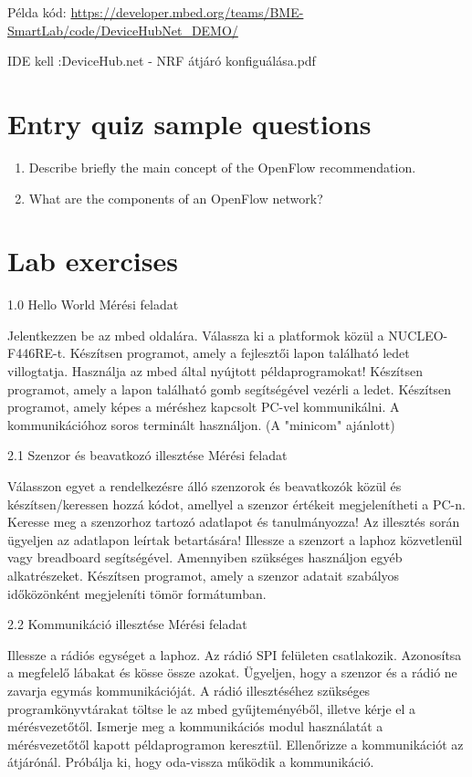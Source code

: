 \documentclass[a4paper]{article}
\begin{document}
Példa kód: \url{https://developer.mbed.org/teams/BME-SmartLab/code/DeviceHubNet_DEMO/}

IDE kell :DeviceHub.net - NRF átjáró konfiguálása.pdf

\appendix

\section{Entry quiz sample questions}

\begin{enumerate}
    \item Describe briefly the main concept of the OpenFlow recommendation.
    \item What are the components of an OpenFlow network?
\end{enumerate}

\section{Lab exercises}

1.0 Hello World
Mérési feladat

Jelentkezzen be az mbed oldalára. Válassza ki a platformok közül a NUCLEO-F446RE-t.
Készítsen programot, amely a fejlesztői lapon található ledet villogtatja.
Használja az mbed által nyújtott példaprogramokat!
Készítsen programot, amely a lapon található gomb segítségével vezérli a ledet.
Készítsen programot, amely képes a méréshez kapcsolt PC-vel kommunikálni. A kommunikációhoz soros terminált
használjon. (A "minicom" ajánlott)

2.1 Szenzor és beavatkozó illesztése
Mérési feladat

Válasszon egyet a rendelkezésre álló szenzorok és beavatkozók közül és készítsen/keressen hozzá kódot, amellyel a
szenzor értékeit megjelenítheti a PC-n.
Keresse meg a szenzorhoz tartozó adatlapot és tanulmányozza! Az illesztés során ügyeljen az adatlapon leírtak
betartására!
Illessze a szenzort a laphoz közvetlenül vagy breadboard segítségével. Amennyiben szükséges használjon egyéb
alkatrészeket.
Készítsen programot, amely a szenzor adatait szabályos időközönként megjeleníti tömör formátumban.

2.2 Kommunikáció illesztése
Mérési feladat

Illessze a rádiós egységet a laphoz. Az rádió SPI felületen csatlakozik. Azonosítsa a megfelelő lábakat és kösse
össze azokat. Ügyeljen, hogy a szenzor és a rádió ne zavarja egymás kommunikációját.
A rádió illesztéséhez szükséges programkönyvtárakat töltse le az mbed gyűjteményéből, illetve kérje el a
mérésvezetőtől.
Ismerje meg a kommunikációs modul használatát a mérésvezetőtől kapott példaprogramon keresztül.
Ellenőrizze a kommunikációt az átjárónál. Próbálja ki, hogy oda-vissza működik a kommunikáció.
\end{document}
